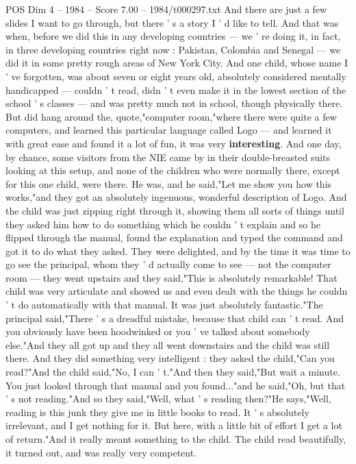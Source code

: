 \begin{textsample}{POS Dim 4 – 1984 – Score 7.00 – 1984/t000297.txt}
And there are just a few slides I want to go through, but there ' s a story I ' d like to tell.
And that was when, before we did this in any developing countries — we ' re doing it, in fact, in three developing countries right now : Pakistan, Colombia and Senegal — we did it in some pretty rough areas of New York City.
And one child, whose name I ' ve forgotten, was about seven or eight years old, absolutely considered mentally handicapped — couldn ' t read, didn ' t even make it in the lowest section of the school ' s classes — and was pretty much not in school, though physically there.
But did hang around the, quote,"computer room,"where there were quite a few computers, and learned this particular language called Logo — and learned it with great ease and found it a lot of fun, it was very \textbf{interesting}.
And one day, by chance, some visitors from the NIE came by in their double-breasted suits looking at this setup, and none of the children who were normally there, except for this one child, were there.
He was, and he said,"Let me show you how this works,"and they got an absolutely ingenuous, wonderful description of Logo.
And the child was just zipping right through it, showing them all sorts of things until they asked him how to do something which he couldn ' t explain and so he flipped through the manual, found the explanation and typed the command and got it to do what they asked.
They were delighted, and by the time it was time to go see the principal, whom they ' d actually come to see — not the computer room — they went upstairs and they said,"This is absolutely remarkable!
That child was very articulate and showed us and even dealt with the things he couldn ' t do automatically with that manual.
It was just absolutely fantastic."The principal said,"There ' s a dreadful mistake, because that child can ' t read.
And you obviously have been hoodwinked or you ' ve talked about somebody else."And they all got up and they all went downstairs and the child was still there.
And they did something very intelligent : they asked the child,"Can you read?"And the child said,"No, I can ' t."And then they said,"But wait a minute.
You just looked through that manual and you found..."and he said,"Oh, but that ' s not reading."And so they said,"Well, what ' s reading then?"He says,"Well, reading is this junk they give me in little books to read.
It ' s absolutely irrelevant, and I get nothing for it.
But here, with a little bit of effort I get a lot of return."And it really meant something to the child.
The child read beautifully, it turned out, and was really very competent.

\end{textsample}
